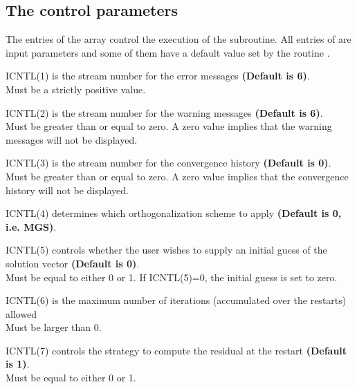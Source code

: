 \subsection{The control parameters}\label{sec:controlPar}
%
The entries of the array  control the execution of the
 subroutine.
All entries of  are input parameters and some of them
have a default value set by the routine . \\
%
\begin{listparam}
\item[ICNTL(1)] is the stream number for the error messages {\bf (Default is 6)}. \\
     Must be a strictly positive value.
 \item[ICNTL(2)] is the stream number for the warning messages {\bf (Default is 6)}. \\
     Must be greater than or equal to zero.
     A zero value implies that the warning messages will not be displayed.
 \item[ICNTL(3)] is the stream number for the convergence history {\bf (Default is 0)}. \\
     Must be greater than or equal to zero.
     A zero value implies that the convergence history will not be displayed.
 \item[ICNTL(4)] determines which orthogonalization scheme to apply {\bf (Default is 0, i.e. MGS)}.
 \item[ICNTL(5)] controls whether the user wishes to supply an initial
     guess of the solution vector
     {\bf (Default is 0)}. \\
      Must be equal to either 0 or 1.
     If ICNTL(5)=0, the initial guess is set to zero.
 \item[ICNTL(6)] is the maximum number of iterations (accumulated over the
                 restarts) allowed
       \\
      Must be larger than 0.
 \item[ICNTL(7)] controls the strategy to compute the residual at the restart
              {\bf (Default is 1)}. \\
       Must be equal to either 0 or 1.
\end{listparam}

